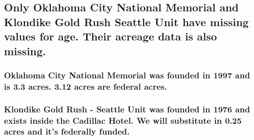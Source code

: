 \documentclass[
]{article}
\begin{document}
\hypertarget{only-oklahoma-city-national-memorial-and-klondike-gold-rush-seattle-unit-have-missing-values-for-age.-their-acreage-data-is-also-missing.}{%
\subsection{Only Oklahoma City National Memorial and Klondike Gold Rush
Seattle Unit have missing values for age. Their acreage data is also
missing.}\label{only-oklahoma-city-national-memorial-and-klondike-gold-rush-seattle-unit-have-missing-values-for-age.-their-acreage-data-is-also-missing.}}

\hypertarget{oklahoma-city-national-memorial-was-founded-in-1997-and-is-3.3-acres.-3.12-acres-are-federal-acres.}{%
\subsubsection{Oklahoma City National Memorial was founded in 1997 and
is 3.3 acres. 3.12 acres are federal
acres.}\label{oklahoma-city-national-memorial-was-founded-in-1997-and-is-3.3-acres.-3.12-acres-are-federal-acres.}}

\hypertarget{klondike-gold-rush---seattle-unit-was-founded-in-1976-and-exists-inside-the-cadillac-hotel.-we-will-substitute-in-0.25-acres-and-its-federally-funded.}{%
\subsubsection{Klondike Gold Rush - Seattle Unit was founded in 1976 and
exists inside the Cadillac Hotel. We will substitute in 0.25 acres and
it's federally
funded.}\label{klondike-gold-rush---seattle-unit-was-founded-in-1976-and-exists-inside-the-cadillac-hotel.-we-will-substitute-in-0.25-acres-and-its-federally-funded.}}
\end{document}
